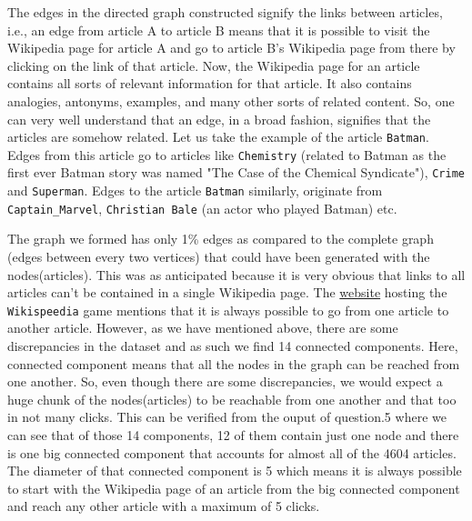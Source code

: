 \documentclass[letterpaper,12pt]{article}
\begin{document}
The edges in the directed graph constructed signify the links between articles, i.e., an edge from article A to article B means that it is possible to visit the Wikipedia page for article A and go to article B's Wikipedia page from there by clicking on the link of that article. Now, the Wikipedia page for an article contains all sorts of relevant information for that article. It also contains analogies, antonyms, examples, and many other sorts of related content. So, one can very well understand that an edge, in a broad fashion, signifies that the articles are somehow related. Let us take the example of the article \verb|Batman|. Edges from this article go to articles like \verb|Chemistry| (related to Batman as the first ever Batman story was named "The Case of the Chemical Syndicate"), \verb|Crime| and \verb|Superman|. Edges to the article \verb|Batman| similarly, originate from \verb|Captain_Marvel|, \verb|Christian Bale| (an actor who played Batman) etc. 

The graph we formed has only 1\% edges as compared to the complete graph (edges between every two vertices) that could have been generated with the nodes(articles). This was as anticipated because it is very obvious that links to all articles can't be contained in a single Wikipedia page. The \href{https://dlab.epfl.ch/wikispeedia/play/}{website} hosting the \verb|Wikispeedia| game mentions that it is always possible to go from one article to another article. However, as we have mentioned above, there are some discrepancies in the dataset and as such we find 14 connected components. Here, connected component means that all the nodes in the graph can be reached from one another. So, even though there are some discrepancies, we would expect a huge chunk of the nodes(articles) to be reachable from one another and that too in not many clicks. This can be verified from the ouput of question.5 where we can see that of those 14 components, 12 of them contain just one node and there is one big connected component that accounts for almost all of the 4604 articles. The diameter of that connected component is 5 which means it is always possible to start with the Wikipedia page of an article from the big connected component and reach any other article with a maximum of 5 clicks. 
\end{document}
